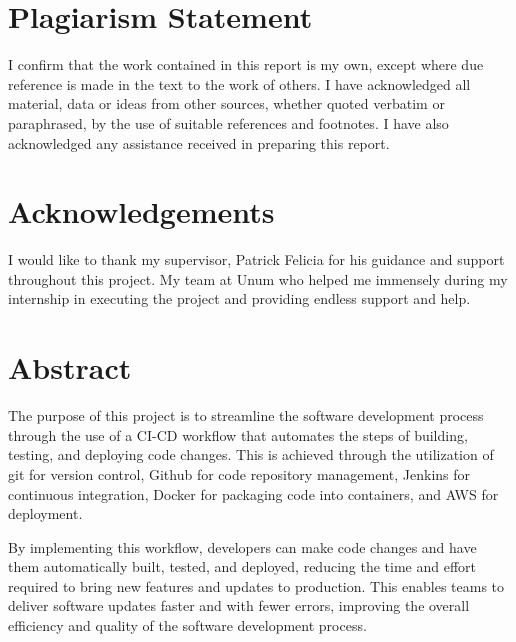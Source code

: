 \documentclass[
  10pt,
  paper=a4,
  ,captions=tableheading
]{scrartcl}
\begin{document}



{
\setcounter{tocdepth}{3}
\tableofcontents
\newpage
}
\hypertarget{plagiarism-statement}{%
\section{Plagiarism Statement}\label{plagiarism-statement}}

I confirm that the work contained in this report is my own, except where
due reference is made in the text to the work of others. I have
acknowledged all material, data or ideas from other sources, whether
quoted verbatim or paraphrased, by the use of suitable references and
footnotes. I have also acknowledged any assistance received in preparing
this report.

\hypertarget{acknowledgements}{%
\section{Acknowledgements}\label{acknowledgements}}

I would like to thank my supervisor, Patrick Felicia for his guidance
and support throughout this project. My team at Unum who helped me
immensely during my internship in executing the project and providing
endless support and help.

\hypertarget{abstract}{%
\section{Abstract}\label{abstract}}

The purpose of this project is to streamline the software development
process through the use of a CI-CD workflow that automates the steps of
building, testing, and deploying code changes. This is achieved through
the utilization of git for version control, Github for code repository
management, Jenkins for continuous integration, Docker for packaging
code into containers, and AWS for deployment.

By implementing this workflow, developers can make code changes and have
them automatically built, tested, and deployed, reducing the time and
effort required to bring new features and updates to production. This
enables teams to deliver software updates faster and with fewer errors,
improving the overall efficiency and quality of the software development
process.
\end{document}
